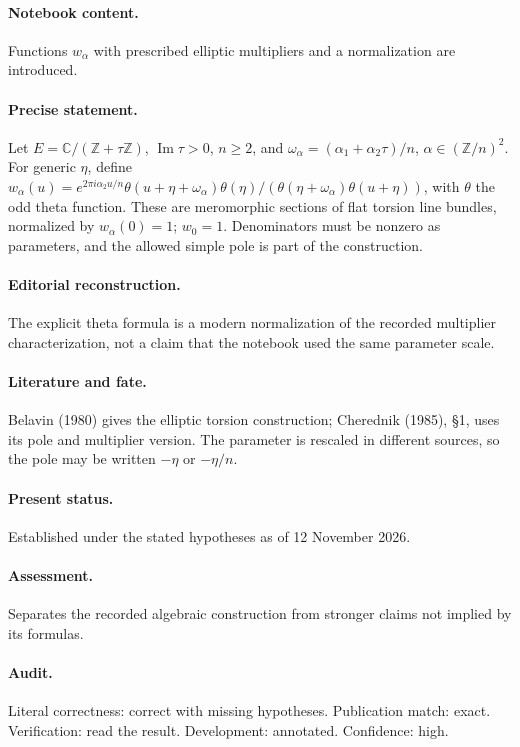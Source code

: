 \paragraph{Notebook content.} Functions \(w_\alpha\) with prescribed elliptic multipliers and a normalization are introduced.

\paragraph{Precise statement.} Let \(E=\mathbb C/(\mathbb Z+\tau\mathbb Z)\), \(\operatorname{Im}\tau>0\), \(n\ge2\), and \(\omega_\alpha=(\alpha_1+\alpha_2\tau)/n\), \(\alpha\in(\mathbb Z/n)^2\). For generic \(\eta\), define \(w_\alpha(u)=e^{2\pi i\alpha_2u/n}\theta(u+\eta+\omega_\alpha)\theta(\eta)/(\theta(\eta+\omega_\alpha)\theta(u+\eta))\), with \(\theta\) the odd theta function. These are meromorphic sections of flat torsion line bundles, normalized by \(w_\alpha(0)=1\); \(w_0=1\). Denominators must be nonzero as parameters, and the allowed simple pole is part of the construction.

\paragraph{Editorial reconstruction.} The explicit theta formula is a modern normalization of the recorded multiplier characterization, not a claim that the notebook used the same parameter scale.

\paragraph{Literature and fate.} Belavin (1980) gives the elliptic torsion construction; Cherednik (1985), \S1, uses its pole and multiplier version. The parameter is rescaled in different sources, so the pole may be written \(-\eta\) or \(-\eta/n\).

\paragraph{Present status.} Established under the stated hypotheses as of 12 November 2026.

\paragraph{Assessment.} Separates the recorded algebraic construction from stronger claims not implied by its formulas.

\paragraph{Audit.} Literal correctness: correct with missing hypotheses. Publication match: exact. Verification: read the result. Development: annotated. Confidence: high.

